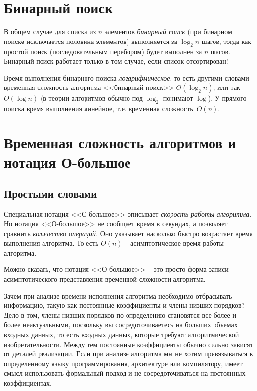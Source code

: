 \documentclass[%
	11pt,
	a4paper,
	utf8,
		]{article}
\begin{document}
\section{Бинарный поиск}

В общем случае для списка из $ n $ элементов \emph{бинарный поиск} (при бинарном поиске исключается половина элементов) выполняется за $ \log_2 n $ шагов, тогда как простой поиск (последовательным перебором) будет выполнен за $ n $ шагов. Бинарный поиск работает только в том случае, если список отсортирован!

Время выполнения бинарного поиска \emph{логарифмическое}, то есть другими словами временная сложность алгоритма <<бинарный поиск>> $ O(\log_2 n) $, или так $ O(\log n) $ (в теории алгоритмов обычно под $ \log_2 $ понимают $ \log $). У прямого поиска время выполнения линейное, т.е. временная сложность~$ O(n) $.

\section{Временная сложность алгоритмов и нотация О-большое}

\subsection{Простыми словами}

Специальная нотация <<О-большое>> описывает \emph{скорость работы алгоритма}. Но нотация <<О-большое>> не сообщает время в секундах, а позволяет сравнить \emph{количество операций}. Оно указывает насколько быстро возрастает время выполнения алгоритма. То есть $ O(n) $ -- асимптотическое время работы алгоритма.

Можно сказать, что нотация <<О-большое>> -- это просто форма записи асимптотического представления временной сложности алгоритма.


Зачем при анализе времени исполнения алгоритма необходимо отбрасывать информацию, такую как постоянные коэффициенты и члены низших порядков? Дело в том, члены низших порядков по определению становятся все более и более неактуальными, поскольку вы сосредоточиваетесь на больших объемах входных данных, то есть входных данных, которые требуют алгоритмической изобретательности. Между тем постоянные коэффициенты обычно сильно зависят от деталей реализации. Если при анализе алгоритма мы не хотим привязываться к определенному языку программирования, архитектуре или компилятору, имеет смысл использовать формальный подход и не сосредоточиваться на постоянных коэффициентах.
\end{document}
